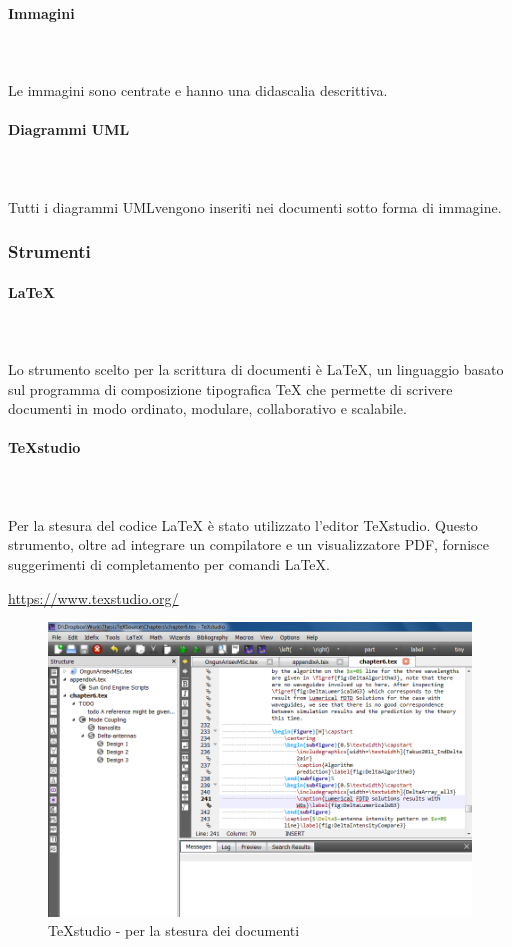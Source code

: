 		\paragraph{Immagini} \mbox{}\\ \mbox{}\\
		Le immagini sono centrate e hanno una didascalia descrittiva. 
		\paragraph{Diagrammi UML} \mbox{}\\ \mbox{}\\
		Tutti i diagrammi UML\glosp vengono inseriti nei documenti sotto forma di immagine.
	\subsubsection{Strumenti}
		\paragraph{\LaTeX} \mbox{}\\ \mbox{}\\
		Lo strumento scelto per la scrittura di documenti è \LaTeX{}, un linguaggio basato sul programma di composizione tipografica \TeX{} che permette di scrivere documenti in modo ordinato, modulare, collaborativo e scalabile.
		\paragraph{\TeX{}studio} \mbox{}\\ \mbox{}\\
		Per la stesura del codice \LaTeX{} è stato utilizzato l'editor \TeX{}studio. Questo strumento, oltre ad integrare un compilatore e un visualizzatore PDF, fornisce suggerimenti di completamento per comandi \LaTeX{}. \newline
		\centerline{\url{https://www.texstudio.org/}}
		\begin{figure}[H]
			\includegraphics[width=0.99\linewidth]{res/images/latex.jpg}
			\caption{\TeX{}studio - per la stesura dei documenti}
		\end{figure} 
